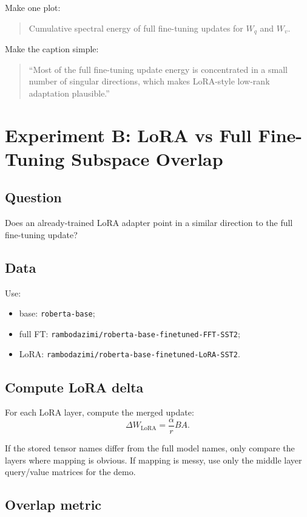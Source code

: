 \documentclass[11pt]{article}
\begin{document}
Make one plot:
\begin{quote}
Cumulative spectral energy of full fine-tuning updates for $W_q$ and $W_v$.
\end{quote}

Make the caption simple:
\begin{quote}
``Most of the full fine-tuning update energy is concentrated in a small number of singular directions, which makes LoRA-style low-rank adaptation plausible.''
\end{quote}

\section{Experiment B: LoRA vs Full Fine-Tuning Subspace Overlap}

\subsection{Question}

Does an already-trained LoRA adapter point in a similar direction to the full fine-tuning update?

\subsection{Data}

Use:
\begin{itemize}
    \item base: \texttt{roberta-base};
    \item full FT: \texttt{rambodazimi/roberta-base-finetuned-FFT-SST2};
    \item LoRA: \texttt{rambodazimi/roberta-base-finetuned-LoRA-SST2}.
\end{itemize}

\subsection{Compute LoRA delta}

For each LoRA layer, compute the merged update:
\[
\Delta W_{\mathrm{LoRA}} = \frac{\alpha}{r}BA.
\]

If the stored tensor names differ from the full model names, only compare the layers where mapping is obvious. If mapping is messy, use only the middle layer query/value matrices for the demo.

\subsection{Overlap metric}
\end{document}

